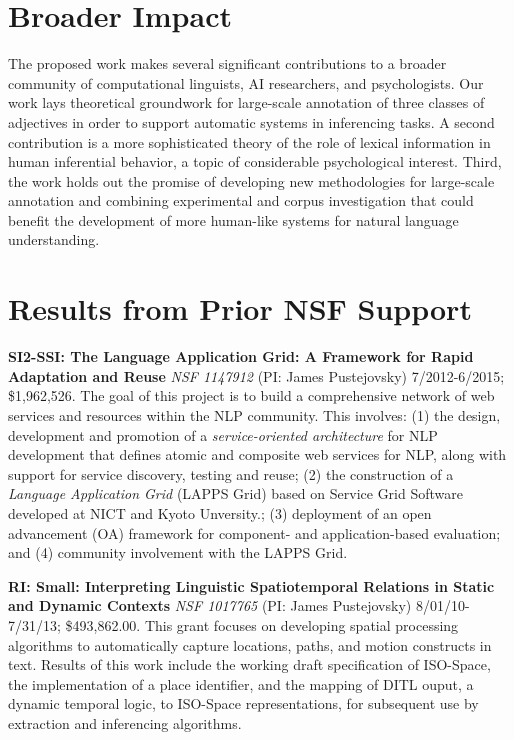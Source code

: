 \documentclass[10pt]{article}
\newcommand{\miniskip}{\vspace*{1mm}}
\begin{document}
\vspace {-5mm}
\section{Broader Impact}

\vspace {-3mm}
 
The proposed work  makes several significant contributions to a broader community of computational linguists, AI researchers, and psychologists. 
Our work lays theoretical groundwork for large-scale annotation of three classes of adjectives in order to support automatic systems in inferencing tasks. 
A second contribution is a more sophisticated theory of the role of lexical information in human inferential behavior, a topic of considerable psychological interest.
Third, the work holds out the promise of developing new methodologies for large-scale annotation and combining experimental and corpus investigation that could benefit the development of more human-like systems for natural language understanding.


\vspace {-5mm}
\section{Results from Prior NSF Support}

\vspace {-3mm}

\noindent
 {\bf SI2-SSI: The Language Application Grid: A Framework for Rapid Adaptation and Reuse} 
{\it NSF 1147912} (PI: James Pustejovsky) 7/2012-6/2015; \$1,962,526.
The goal of this  project is to  build  a comprehensive network of web services and resources within the NLP community. This involves:
(1) the design, development  and promotion of a {\it service-oriented architecture} for NLP development that defines atomic and composite web services for NLP, along with support for service discovery, testing and reuse; (2)  the construction of a {\it Language Application Grid} (LAPPS Grid) based on Service Grid Software developed at NICT and Kyoto Unversity.; (3)  deployment of an open advancement (OA) framework for
component- and application-based evaluation; and  (4)   community involvement with the LAPPS Grid.  

\noindent
 {\bf 
RI: Small: Interpreting Linguistic Spatiotemporal Relations in Static and Dynamic Contexts}
{\it NSF 1017765} (PI: James Pustejovsky)  8/01/10-7/31/13; 
\$493,862.00. This grant focuses on developing spatial processing algorithms  to automatically capture locations, paths, and motion constructs in text.  Results of this work include the working draft specification of ISO-Space, the implementation of a place identifier, and the mapping of DITL ouput, a dynamic temporal logic, to ISO-Space representations, for subsequent use by extraction and inferencing algorithms. 
\end{document}
